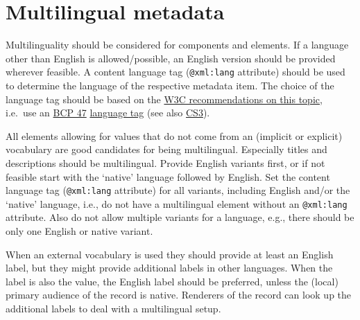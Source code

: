 \section{Multilingual metadata}\label{multilingual-metadata}

Multilinguality should be considered for components and elements. If a language other than English is allowed/possible, an English version should be provided wherever feasible. A content language tag (\texttt{@xml:lang} attribute) should be used to determine the language of the respective metadata item. The choice of the language tag should be based on the
\href{https://www.w3.org/International/questions/qa-choosing-language-tags}{W3C recommendations on this topic}, i.e.~use an
\href{https://tools.ietf.org/rfc/bcp/bcp47.txt}{BCP 47}
\href{https://www.iana.org/assignments/language-subtag-registry/language-subtag-registry}{language
tag} (see also \hyperref[cs3]{CS3}).

All elements allowing for values that do not come from an (implicit or explicit) vocabulary are good candidates for being multilingual. Especially titles and descriptions should be multilingual. Provide English variants first, or if not feasible start with the `native' language followed by English. Set the content language tag (\texttt{@xml:lang} attribute) for all variants, including English and/or the `native' language, i.e., do not have a multilingual element without an \texttt{@xml:lang} attribute. Also do not allow multiple
variants for a language, e.g., there should be only one English or native variant.

When an external vocabulary is used they should provide at least an English label, but they might provide additional labels in other languages. When the label is also the value, the English label should be preferred, unless the (local) primary audience of the record is native. Renderers of the record can look up the additional labels to deal with a
multilingual setup.
